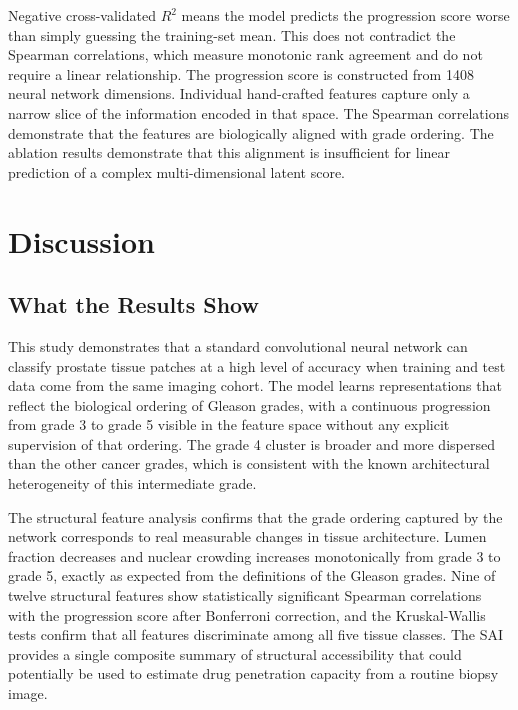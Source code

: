 \documentclass[12pt, a4paper]{article}
\begin{document}
Negative cross-validated $R^2$ means the model predicts the progression score
worse than simply guessing the training-set mean. This does not contradict the
Spearman correlations, which measure monotonic rank agreement and do not require
a linear relationship. The progression score is constructed from 1408 neural
network dimensions. Individual hand-crafted features capture only a narrow slice
of the information encoded in that space. The Spearman correlations demonstrate
that the features are biologically aligned with grade ordering. The ablation results
demonstrate that this alignment is insufficient for linear prediction of a complex
multi-dimensional latent score.

\section{Discussion}

\subsection{What the Results Show}

This study demonstrates that a standard convolutional neural network can classify
prostate tissue patches at a high level of accuracy when training and test data
come from the same imaging cohort. The model learns representations that reflect
the biological ordering of Gleason grades, with a continuous progression from
grade 3 to grade 5 visible in the feature space without any explicit supervision
of that ordering. The grade 4 cluster is broader and more dispersed than the
other cancer grades, which is consistent with the known architectural heterogeneity
of this intermediate grade.

The structural feature analysis confirms that the grade ordering captured by the
network corresponds to real measurable changes in tissue architecture. Lumen
fraction decreases and nuclear crowding increases monotonically from grade 3 to
grade 5, exactly as expected from the definitions of the Gleason grades. Nine of
twelve structural features show statistically significant Spearman correlations with
the progression score after Bonferroni correction, and the Kruskal-Wallis tests
confirm that all features discriminate among all five tissue classes. The SAI
provides a single composite summary of structural accessibility that could
potentially be used to estimate drug penetration capacity from a routine biopsy
image.
\end{document}
